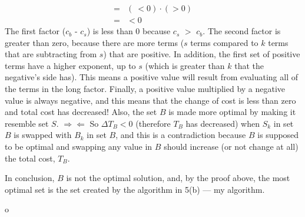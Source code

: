 \documentclass[11pt]{article}
\begin{document}
\begin{flushleft}
\begin{enumerate}
{\begin{enumerate}
{\begin{align}
				      					      		      				      				      	= & (\ < 0 )\cdot( > 0 ) \nonumber                                                      \\
				      					      		      				      				      	= & < 0                                                                                 
				      					      		      				      				      \end{align}
				      					      		      				      				      The first factor ($c_b$ - $c_s$) is less than 0 because $c_s$ $>$ $c_b$. The second factor is greater than zero, because there are more terms ($s$ terms compared to $k$ terms that are subtracting from $s$) that are positive. In addition, the first set of positive terms have a higher exponent, up to $s$ (which is greater than $k$ that the negative's side has). This means a positive value will result from evaluating all of the terms in the long factor. Finally, a positive value multiplied by a negative value is always negative, and this means that the change of cost is less than zero and total cost has decreased! Also, the set $B$ is made more optimal by making it resemble set $S$.  $\Rightarrow \Leftarrow$\linebreak
				      					      		      				      				      \linebreak
				      					      		      				      				      So $\Delta T_B < 0$ (therefore $T_B$ has decreased) when $S_k$ in set $B$ is swapped with $B_k$ in set $B$, and this is a contradiction because $B$ is supposed to be optimal and swapping any value in $B$ should increase (or not change at all) the total cost, $T_B$. \linebreak
				      					      		      				      				      
				      					      		      				      				      In conclusion, $B$ is not the optimal solution, and, by the proof above, the most optimal set is the set created by the algorithm in 5(b) --- my algorithm.
				      					      		      				      				}
				      					      		      				      			\end{enumerate}
				      					      		      				      		}
				      					      		      				      		
				      					      		      				      	\end{enumerate}
				      					      		      				      \end{flushleft}o
				      					      		      				      
\end{document}
